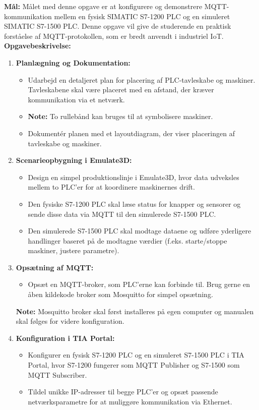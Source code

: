\textbf{Mål:} Målet med denne opgave er at konfigurere og demonstrere MQTT-kommunikation mellem en fysisk SIMATIC S7-1200 PLC og en simuleret SIMATIC S7-1500 PLC. Denne opgave vil give de studerende en praktisk forståelse af MQTT-protokollen, som er bredt anvendt i industriel IoT.
\newline\newline
\noindent\textbf{Opgavebeskrivelse:}
\begin{enumerate}
	\item \textbf{Planlægning og Dokumentation:}
	\begin{itemize}
		\item Udarbejd en detaljeret plan for placering af PLC-tavleskabe og maskiner. Tavleskabene skal være placeret med en afstand, der kræver kommunikation via et netværk.
		\item \textbf{Note:} To rullebånd kan bruges til at symbolisere maskiner.
		\item Dokumentér planen med et layoutdiagram, der viser placeringen af tavleskabe og maskiner.
	\end{itemize}
	
	\item \textbf{Scenarieopbygning i Emulate3D:}
	\begin{itemize}
		\item Design en simpel produktionslinje i Emulate3D, hvor data udveksles mellem to PLC'er for at koordinere maskinernes drift.
		\item Den fysiske S7-1200 PLC skal læse status for knapper og sensorer og sende disse data via MQTT til den simulerede S7-1500 PLC.
		\item Den simulerede S7-1500 PLC skal modtage dataene og udføre yderligere handlinger baseret på de modtagne værdier (f.eks. starte/stoppe maskiner, justere parametre).
	\end{itemize}
	
	\item \textbf{Opsætning af MQTT:}
	\begin{itemize}
		\item Opsæt en MQTT-broker, som PLC'erne kan forbinde til. Brug gerne en åben kildekode broker som Mosquitto for simpel opsætning.
	\end{itemize}
	\textbf{Note:} Mosquitto broker skal først installeres på egen computer og manualen skal følges for videre konfiguration.
	\item \textbf{Konfiguration i TIA Portal:}
	\begin{itemize}
		\item Konfigurer en fysisk S7-1200 PLC og en simuleret S7-1500 PLC i TIA Portal, hvor S7-1200 fungerer som MQTT Publisher og S7-1500 som MQTT Subscriber.
		\item Tildel unikke IP-adresser til begge PLC'er og opsæt passende netværksparametre for at muliggøre kommunikation via Ethernet.
	\end{itemize}
	

\end{enumerate}
